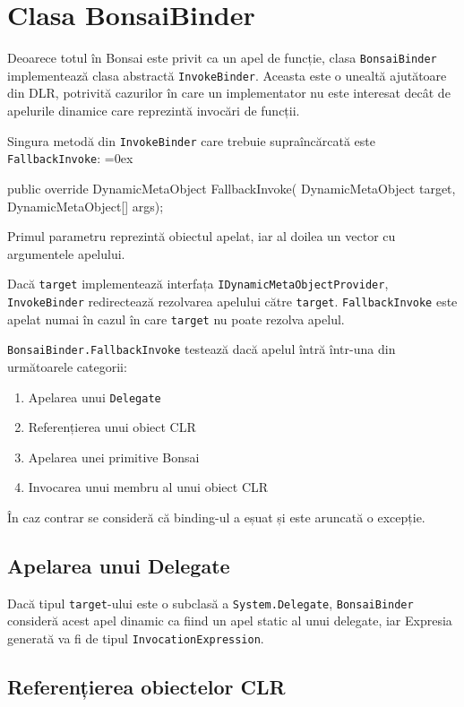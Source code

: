 \documentclass[12pt,a4paper]{memoir}
\renewcommand{\c}{\texttt}
\newenvironment{code}
{
\definecolor{shadecolor}{gray}{0.91}
\topsep=0ex
\relax
\shaded
\verbatim
}
{
\endverbatim
\endshaded
}
\begin{document}
\section{Clasa BonsaiBinder}

Deoarece totul în Bonsai este privit ca un apel de funcție, clasa \c{BonsaiBinder} implementează clasa abstractă \c{InvokeBinder}. Aceasta este o unealtă ajutătoare din DLR, potrivită cazurilor în care un implementator nu este interesat decât de apelurile dinamice care reprezintă invocări de funcții. 

Singura metodă din \c{InvokeBinder} care trebuie supraîncărcată este \c{FallbackInvoke}:
\begin{code}
public override DynamicMetaObject FallbackInvoke(
  DynamicMetaObject target,
  DynamicMetaObject[] args);
\end{code}
Primul parametru reprezintă obiectul apelat, iar al doilea un vector cu argumentele apelului.

Dacă \c{target} implementează interfața \c{IDynamicMetaObjectProvider}, \c{InvokeBinder} redirectează rezolvarea apelului către \c{target}. \c{FallbackInvoke} este apelat numai în cazul în care \c{target} nu poate rezolva apelul.

\c{BonsaiBinder.FallbackInvoke} testează dacă apelul întră într-una din următoarele categorii:
\begin{enumerate}
\item Apelarea unui \c{Delegate}
\item Referențierea unui obiect CLR
\item Apelarea unei primitive Bonsai
\item Invocarea unui membru al unui obiect CLR
\end{enumerate}

În caz contrar se consideră că binding-ul a eșuat și este aruncată o excepție.

\subsection{Apelarea unui Delegate}

Dacă tipul \c{target}-ului este o subclasă a \c{System.Delegate}, \c{BonsaiBinder} consideră acest apel dinamic ca fiind un apel static al unui delegate, iar Expresia generată va fi de tipul \c{InvocationExpression}.

\subsection{Referențierea obiectelor CLR}
\end{document}
